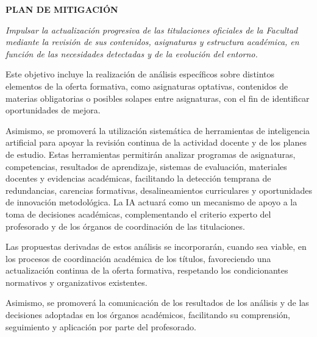 \documentclass[11pt,a4paper]{scrreprt}
\begin{document}
\begin{tcolorbox}[mitbox]
{\footnotesize\sffamily\bfseries\color{green!40!black} PLAN DE MITIGACI\'ON}\par{}
\end{tcolorbox}
\vspace{8pt}



\newpage
{}
{\small\color{mutedcolor}\itshape Impulsar la actualización progresiva de las titulaciones oficiales de la Facultad mediante la revisión de sus contenidos, asignaturas y estructura académica, en función de las necesidades detectadas y de la evolución del entorno. 

Este objetivo incluye la realización de análisis específicos sobre distintos elementos de la oferta formativa, como asignaturas optativas, contenidos de materias obligatorias o posibles solapes entre asignaturas, con el fin de identificar oportunidades de mejora. 

Asimismo, se promoverá la utilización sistemática de herramientas de inteligencia artificial para apoyar la revisión continua de la actividad docente y de los planes de estudio. Estas herramientas permitirán analizar programas de asignaturas, competencias, resultados de aprendizaje, sistemas de evaluación, materiales docentes y evidencias académicas, facilitando la detección temprana de redundancias, carencias formativas, desalineamientos curriculares y oportunidades de innovación metodológica. La IA actuará como un mecanismo de apoyo a la toma de decisiones académicas, complementando el criterio experto del profesorado y de los órganos de coordinación de las titulaciones.

Las propuestas derivadas de estos análisis se incorporarán, cuando sea viable, en los procesos de coordinación académica de los títulos, favoreciendo una actualización continua de la oferta formativa, respetando los condicionantes normativos y organizativos existentes. 

Asimismo, se promoverá la comunicación de los resultados de los análisis y de las decisiones adoptadas en los órganos académicos, facilitando su comprensión, seguimiento y aplicación por parte del profesorado. }\par\vspace{6pt}
\end{document}

